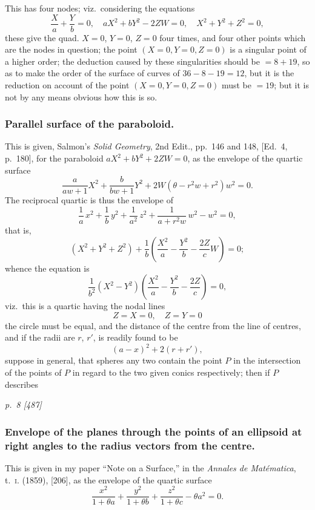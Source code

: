 \documentclass[11pt,a4paper]{book}
\begin{document}
This has four nodes; viz.\ considering the equations
\[
\frac{X}{a} + \frac{Y}{b} = 0, \quad aX^2 + bY^2 - 2ZW = 0, \quad X^2 + Y^2 + Z^2 = 0,
\]
these give the quad. $X = 0$, $Y = 0$, $Z = 0$ four times, and four other points which are
the nodes in question; the point $(X = 0, Y = 0, Z = 0)$ is a singular point of a higher
order; the deduction caused by these singularities should be $= 8 + 19$, so as to make
the order of the surface of curves of $36 - 8 - 19 = 12$, but it is the reduction on account
of the point $(X = 0, Y = 0, Z = 0)$ must be $= 19$; but it is not by any means obvious how this is so.

\subsubsection*{Parallel surface of the paraboloid.}

This is given, Salmon's \textit{Solid Geometry}, 2nd Edit., pp.\ 146 and 148, [Ed.\ 4, p.\ 180],
for the paraboloid $aX^2 + bY^2 + 2Z W = 0$, as the envelope of the quartic surface
\[
\frac{a}{aw + 1} X^2 + \frac{b}{bw + 1} Y^2 + 2W(\theta - r^2 w + r^2) w^2 = 0.
\]
The reciprocal quartic is thus the envelope of
\[
\frac{1}{a} \, x^2 + \frac{1}{b} \, y^2 + \frac{1}{a^2} \, z^2 + \frac{1}{a + r^2 w} \, w^2 - w^2 = 0,
\]
that is,
\[
(X^2 + Y^2 + Z^2) + \frac{1}{b}\left(\frac{X^2}{a} - \frac{Y^2}{b} - \frac{2Z}{c}W\right) = 0;
\]
whence the equation is
\[
\frac{1}{b^2}(X^2 - Y^2)\left(\frac{X^2}{a} - \frac{Y^2}{b} - \frac{2Z}{c}\right) = 0,
\]
viz.\ this is a quartic having the nodal lines
\[
Z = X = 0, \quad Z = Y = 0
\]
the circle must be equal, and the distance of the centre from the line of centres, and if the radii are $r$, $r'$, is readily found to be
\[
(a - x)^2 + 2(r + r'),
\]
suppose in general, that spheres any two contain the point $P$ in the intersection of the points of $P$ in regard to the two given conics respectively; then if $P$ describes

\clearpage

\bigskip
\textit{p.~8 [487]}
\smallskip

\subsubsection*{Envelope of the planes through the points of an ellipsoid at right angles to the radius vectors from the centre.}

This is given in my paper ``Note on a Surface,'' in the \textit{Annales de Mat\'ematica},
t.~\textsc{i.} (1859), [206], as the envelope of the quartic surface
\[
\frac{x^2}{1+\theta a} + \frac{y^2}{1+\theta b} + \frac{z^2}{1+\theta c} - \theta a^2 = 0.
\]
\end{document}
